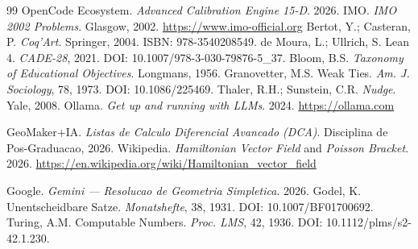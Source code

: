 \documentclass[5p]{elsarticle}
\begin{document}
\begin{thebibliography}{99}
 OpenCode Ecosystem. \textit{Advanced Calibration Engine 15-D}. 2026.
 IMO. \textit{IMO 2002 Problems}. Glasgow, 2002. \url{https://www.imo-official.org}
 Bertot, Y.; Casteran, P. \textit{Coq'Art}. Springer, 2004. ISBN: 978-3540208549.
 de Moura, L.; Ullrich, S. Lean 4. \textit{CADE-28}, 2021. DOI: 10.1007/978-3-030-79876-5\_37.
 Bloom, B.S. \textit{Taxonomy of Educational Objectives}. Longmans, 1956.
 Granovetter, M.S. Weak Ties. \textit{Am. J. Sociology}, 78, 1973. DOI: 10.1086/225469.
 Thaler, R.H.; Sunstein, C.R. \textit{Nudge}. Yale, 2008.
 Ollama. \textit{Get up and running with LLMs}. 2024. \url{https://ollama.com}

 GeoMaker+IA. \textit{Listas de Calculo Diferencial Avancado (DCA)}. Disciplina de Pos-Graduacao, 2026.
 Wikipedia. \textit{Hamiltonian Vector Field} and \textit{Poisson Bracket}. 2026. \url{https://en.wikipedia.org/wiki/Hamiltonian_vector_field}

 Google. \textit{Gemini — Resolucao de Geometria Simpletica}. 2026.
 Godel, K. Unentscheidbare Satze. \textit{Monatshefte}, 38, 1931. DOI: 10.1007/BF01700692.
 Turing, A.M. Computable Numbers. \textit{Proc. LMS}, 42, 1936. DOI: 10.1112/plms/s2-42.1.230.

\end{thebibliography}
\end{document}
